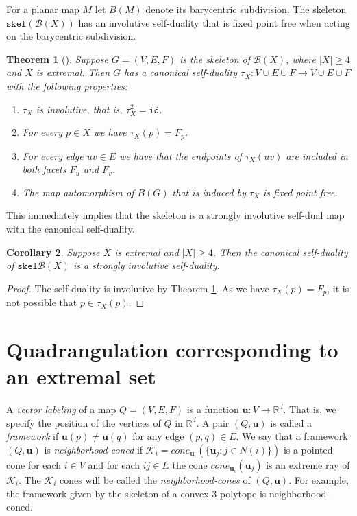 \documentclass[10pt,a4paper]{article}
\newtheorem{theorem}{Theorem}[section]
\newtheorem{corollary}[theorem]{Corollary}
\newcounter{example}
\newcommand{\vu}[0]{\mathbf{u}}
\newcommand{\R}[0]{\mathbb{R}}
\newcommand{\Kc}[0]{\mathcal{K}}
\newcommand{\Bc}[0]{\mathcal{B}}
\newcommand{\skel}[0]{\mathtt{skel}}
\newcommand{\cone}[0]{cone}
\newcommand{\id}{\mathtt{id}}
\begin{document}
For a planar map $M$ let $B(M)$ denote its barycentric subdivision. The skeleton $\skel(\Bc(X))$ has an involutive self-duality that is fixed point free when acting on the barycentric subdivision.

\begin{theorem}[\cite{kupitz2010ball}]\label{thm:canonicalselfduality}
    Suppose $G=(V,E,F)$ is the skeleton of $\Bc(X)$, where $|X|\ge 4$ and $X$ is extremal. Then $G$ has a canonical self-duality $\tau_X:V\cup E\cup F\rightarrow V\cup E\cup F$ with the following properties:
    \begin{enumerate}
        \item $\tau_X$ is involutive, that is, $\tau_X^2=\id$.
        \item For every $p\in X$ we have $\tau_X(p)=F_p$.
        \item For every edge $uv\in E$ we have that the endpoints of $\tau_X(uv)$ are included in both facets $F_u$ and $F_v$.
        \item The map automorphism of $B(G)$ that is induced by $\tau_X$ is fixed point free. 
    \end{enumerate}
\end{theorem}

This immediately implies that the skeleton is a strongly involutive self-dual map with the canonical self-duality.

\begin{corollary}\label{cor:canonicalissisd}
    Suppose $X$ is extremal and $|X|\ge 4$. Then the canonical self-duality of $\skel\Bc(X)$ is a strongly involutive self-duality.
\end{corollary}
\begin{proof}
    The self-duality is involutive by Theorem \ref{thm:canonicalselfduality}. As we have $\tau_X(p)=F_p$, it is not possible that $p\in\tau_X(p)$. 
\end{proof}


\section{Quadrangulation corresponding to an extremal set}\label{sec:quadofext}
A \emph{vector labeling} of a map  $Q=(V,E,F)$  is a function $\vu:V\rightarrow \R^d$. That is, we specify the position of the vertices of $Q$ in $\R^d$. A pair $(Q,\vu)$ is called a \emph{framework} if $\vu(p)\neq \vu(q)$ for any edge $(p,q)\in E$.  We say that a framework $(Q,\vu)$ is \emph{neighborhood-coned} if $\Kc_i=\cone_{\vu_i}(\{\vu_j:j\in N(i)\}) $ is a pointed cone for each $i\in V$ and for each $ij\in E$ the cone $\cone_{\vu_i}(\vu_j)$ is an extreme ray of $\Kc_i$. The $\Kc_i$ cones will be called the \emph{neighborhood-cones} of $(Q,\vu)$. For example, the framework given by the skeleton of a convex 3-polytope is neighborhood-coned. 
\end{document}

